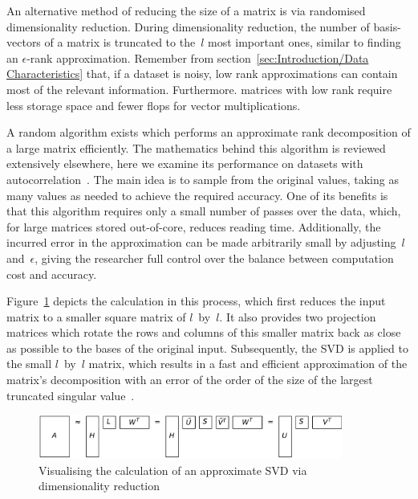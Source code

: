\documentclass[ijgi,article,submit,moreauthors,pdftex,10pt,a4paper]{Definitions/mdpi}
\begin{document}
An alternative method of reducing the size of a matrix is via randomised dimensionality reduction. During dimensionality reduction, the number of basis-vectors of a matrix is truncated to the~$l$ most important ones, similar to finding an $\epsilon$-rank approximation. Remember from section~\ref{sec:Introduction/Data Characteristics} that, if a dataset is noisy, low rank approximations can contain most of the relevant information. Furthermore. matrices with low rank require less storage space and fewer flops for vector multiplications.

A random algorithm exists which performs an approximate rank decomposition of a large matrix efficiently. The mathematics behind this algorithm is reviewed extensively elsewhere, here we examine its performance on datasets with autocorrelation~\cite{Halko2011, Li2016}. The main idea is to sample from the original values, taking as many values as needed to achieve the required accuracy. One of its benefits is that this algorithm requires only a small number of passes over the data, which, for large matrices stored out-of-core, reduces reading time. Additionally, the incurred error in the approximation can be made arbitrarily small by adjusting~$l$ and~$\epsilon$, giving the researcher full control over the balance between computation cost and accuracy.

Figure~\ref{fig:reduceSizeRandomisedSquare} depicts the calculation in this process, which first reduces the input matrix to a smaller square matrix of $l$~by~$l$. It also provides two projection matrices which rotate the rows and columns of this smaller matrix back as close as possible to the bases of the original input. Subsequently, the SVD is applied to the small $l$~by~$l$ matrix, which results in a fast and efficient approximation of the matrix's decomposition with an error of the order of the size of the largest truncated singular value~\cite{Martinsson2016, Halko2011}.

\begin{figure}[H]
\centering
\includegraphics[width=100mm]{Results/reduceSizeRandomisedSquare.pdf}
\caption[Approximate randomised SVD]{Visualising the calculation of an approximate SVD via dimensionality reduction}
\label{fig:reduceSizeRandomisedSquare}
\end{figure}
\end{document}
